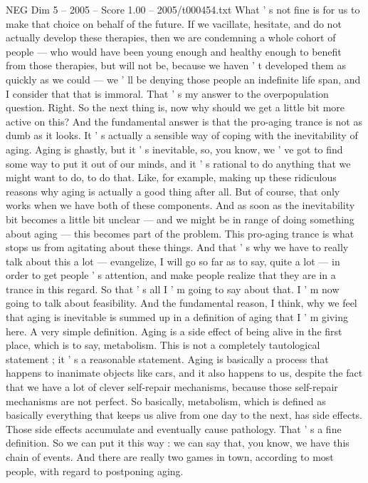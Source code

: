 \begin{textsample}{NEG Dim 5 – 2005 – Score 1.00 – 2005/t000454.txt}
What ' s not fine is for us to make that choice on behalf of the future.
If we vacillate, hesitate, and do not actually develop these therapies, then we are condemning a whole cohort of people — who would have been young enough and healthy enough to benefit from those therapies, but will not be, because we haven ' t developed them as quickly as we could — we ' ll be denying those people an indefinite life span, and I consider that that is immoral.
That ' s my answer to the overpopulation question.
Right.
So the next thing is, now why should we get a little bit more active on this?
And the fundamental answer is that the pro-aging trance is not as dumb as it looks.
It ' s actually a sensible way of coping with the inevitability of aging.
Aging is ghastly, but it ' s inevitable, so, you know, we ' ve got to find some way to put it out of our minds, and it ' s rational to do anything that we might want to do, to do that.
Like, for example, making up these ridiculous reasons why aging is actually a good thing after all.
But of course, that only works when we have both of these components.
And as soon as the inevitability bit becomes a little bit unclear — and we might be in range of doing something about aging — this becomes part of the problem.
This pro-aging trance is what stops us from agitating about these things.
And that ' s why we have to really talk about this a lot — evangelize, I will go so far as to say, quite a lot — in order to get people ' s attention, and make people realize that they are in a trance in this regard.
So that ' s all I ' m going to say about that.
I ' m now going to talk about feasibility.
And the fundamental reason, I think, why we feel that aging is inevitable is summed up in a definition of aging that I ' m giving here.
A very simple definition.
Aging is a side effect of being alive in the first place, which is to say, metabolism.
This is not a completely tautological statement ; it ' s a reasonable statement.
Aging is basically a process that happens to inanimate objects like cars, and it also happens to us, despite the fact that we have a lot of clever self-repair mechanisms, because those self-repair mechanisms are not perfect.
So basically, metabolism, which is defined as basically everything that keeps us alive from one day to the next, has side effects.
Those side effects accumulate and eventually cause pathology.
That ' s a fine definition.
So we can put it this way : we can say that, you know, we have this chain of events.
And there are really two games in town, according to most people, with regard to postponing aging.

\end{textsample}
